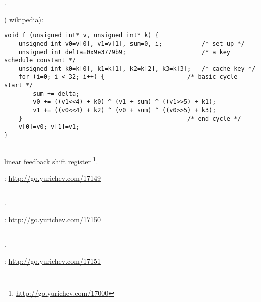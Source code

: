 .

 ( \href{http://go.yurichev.com/17106}{wikipedia}):

\begin{lstlisting}
void f (unsigned int* v, unsigned int* k) {
    unsigned int v0=v[0], v1=v[1], sum=0, i;           /* set up */
    unsigned int delta=0x9e3779b9;                     /* a key schedule constant */
    unsigned int k0=k[0], k1=k[1], k2=k[2], k3=k[3];   /* cache key */
    for (i=0; i < 32; i++) {                       /* basic cycle start */
        sum += delta;
        v0 += ((v1<<4) + k0) ^ (v1 + sum) ^ ((v1>>5) + k1);
        v1 += ((v0<<4) + k2) ^ (v0 + sum) ^ ((v0>>5) + k3);  
    }                                              /* end cycle */
    v[0]=v0; v[1]=v1;
}
\end{lstlisting}


\subsection{}

linear feedback shift register
\footnote{\url{http://go.yurichev.com/17000}}.

\Sourcecode: \url{http://go.yurichev.com/17149}

\subsection{}

.

\Sourcecode: \url{http://go.yurichev.com/17150}

\subsection{}

.

\Sourcecode: \url{http://go.yurichev.com/17151}

\subsection{}

